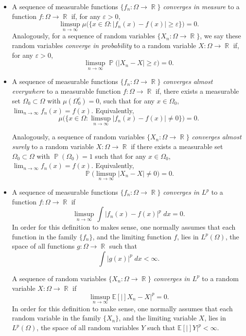 \documentclass[answers]{exam}
\DeclareMathOperator{\RR}{\mathbb{R}}
\DeclareMathOperator{\PP}{\mathbb{P}}
\theoremstyle{problemstyle}
\newcommand{\1}[1]{\textbf{1}_{\left[#1\right]}} %
\newcommand{\EE}[1]{\mathbb{E}\left[#1\right]} %
\begin{document}
\begin{itemize}
    \item A sequence of measurable functions $\{ f_n: \Omega \to \RR \}$ \emph{converges in measure} to a function $f: \Omega \to \RR$ if, for any $\varepsilon > 0$,
    \[ \limsup_{n \to \infty} \mu \Big( \{ x \in \Omega : |f_n(x) - f(x)| \geq \varepsilon \} \Big) = 0. \]
    Analogously, for a sequence of random variables $\{ X_n : \Omega \to \RR \}$, we say these random variables \emph{converge in probability} to a random variable $X: \Omega \to \RR$ if, for any $\varepsilon > 0$,
    \[ \limsup_{n \to \infty} \PP \Big( |X_n - X| \geq \varepsilon \Big) = 0. \]

    \item A sequence of measurable functions $\{ f_n : \Omega \to \RR \}$ \emph{converges almost everywhere} to a measurable function $f: \Omega \to \RR$ if, there exists a measurable set $\Omega_0 \subset \Omega$ with $\mu(\Omega_0^c) = 0$, such that for any $x \in \Omega_0$, $\lim_{n \to \infty} f_n(x) = f(x)$. Equivalently,
    \[ \mu \Big( \{ x \in \Omega : \limsup_{n \to \infty} |f_n(x) - f(x)| \neq 0 \} \Big) = 0. \]

    Analogously, a sequence of random variables $\{ X_n: \Omega \to \RR \}$ \emph{converges almost surely} to a random variable $X: \Omega \to \RR$ if there exists a measurable set $\Omega_0 \subset \Omega$ with $\PP(\Omega_0) = 1$ such that for any $x \in \Omega_0$, $\lim_{n \to \infty} f_n(x) = f(x)$. Equivalently,
    \[ \PP \Big( \limsup_{n \to \infty} |X_n - X| \neq 0 \Big) = 0. \]

    \item A sequence of measurable functions $\{ f_n : \Omega \to \RR \}$ \emph{converges in $L^p$} to a function $f: \Omega \to \RR$ if
    \[ \limsup_{n \to \infty} \int |f_n(x) - f(x)|^p\; dx = 0. \]
    In order for this definition to makes sense, one normally assumes that each function in the family $\{ f_n \}$, and the limiting function $f$, lies in $L^p(\Omega)$, the space of all functions $g: \Omega \to \RR$ such that
    \[ \int |g(x)|^p\; dx < \infty. \]

    A sequence of random variables $\{ X_n : \Omega \to \RR \}$ \emph{converges in $L^p$} to a random variable $X: \Omega \to \RR$ if
    \[ \limsup_{n \to \infty} \EE |X_n - X|^p = 0. \]
    In order for this definition to make sense, one normally assumes that each random variable in the family $\{ X_n \}$, and the limiting variable $X$, lies in $L^p(\Omega)$, the space of all random variables $Y$ such that $\EE |Y|^p < \infty$.
\end{itemize}
\end{document}
